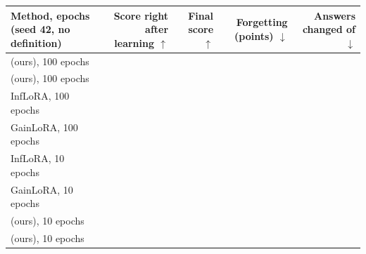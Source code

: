 {\footnotesize\setlength{\tabcolsep}{3pt}\begin{tabular}{p{1.95in}rrrr}
    \toprule
    Method, epochs (seed 42, no definition) & \shortstack[r]{Score right\\after\\learning $\uparrow$} & \shortstack[r]{Final\\score $\uparrow$} & \shortstack[r]{Forgetting\\(points) $\downarrow$} & \shortstack[r]{Answers\\changed\\of \AudFullCompared{} $\downarrow$} \\
    \midrule
    \recog{} (ours), 100 epochs & \AudFullOursRidgeLearned{} & \AudFullOursRidgeAP{} & \AudFullOursRidgeFT{} & \AudFullOursRidgeChanged{} \\
    \handicap{} (ours), 100 epochs & \AudFullOursHandicapLearned{} & \AudFullOursHandicapAP{} & \AudFullOursHandicapFT{} & \AudFullOursHandicapChanged{} \\
    \midrule
    InfLoRA, 100 epochs & \AudFullInfloraLearned{} & \AudFullInfloraAP{} & \AudFullInfloraFT{} & \AudFullInfloraChanged{} \\
    GainLoRA, 100 epochs & \AudFullGainloraLearned{} & \AudFullGainloraAP{} & \AudFullGainloraFT{} & \AudFullGainloraChanged{} \\
    \midrule
    InfLoRA, 10 epochs & \AudPubInfloraNoDefLearned{} & \AudPubInfloraNoDefAP{} & \AudPubInfloraNoDefFT{} & \AudPubInfloraNoDefChanged{} \\
    GainLoRA, 10 epochs & \AudPubGainloraNoDefLearned{} & \AudPubGainloraNoDefAP{} & \AudPubGainloraNoDefFT{} & \AudPubGainloraNoDefChanged{} \\
    \midrule
    \recog{} (ours), 10 epochs & \AudOursRidgeLearned{} & \AudOursRidgeAP{} & \AudOursRidgeFT{} & \AudOursRidgeChanged{} \\
    \handicap{} (ours), 10 epochs & \AudOursHandicapLearned{} & \AudOursHandicapAP{} & \AudOursHandicapFT{} & \AudOursHandicapChanged{} \\
    \bottomrule
\end{tabular}}

